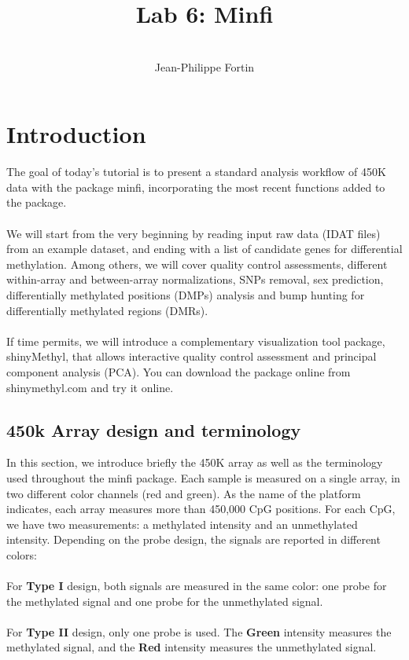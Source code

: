\documentclass[12pt]{article}
\title{\textbf{Lab 6: Minfi}}
\author{\\ Jean-Philippe Fortin }
\newcommand{\Rpackage}[1]{\textsf{#1}}
\begin{document}
\maketitle

\section{Introduction}
The goal of today's tutorial is to present a standard analysis workflow of 450K data with the package \Rpackage{minfi}, incorporating the most recent functions added to the package. \\
\\
We will start from the very beginning by reading input raw data (IDAT files) from an example dataset, and ending with a list of candidate genes for differential methylation. Among others, we will cover quality control assessments, different within-array and between-array normalizations, SNPs removal, sex prediction, differentially methylated positions (DMPs) analysis and bump hunting for differentially methylated regions (DMRs). \\
\\ 
If time permits, we will introduce a complementary visualization tool package, \Rpackage{shinyMethyl}, that allows interactive quality control assessment and principal component analysis (PCA). You can download the package online from shinymethyl.com and try it online.
\subsection*{450k Array design and terminology}
In this section, we introduce briefly the 450K array as well as the terminology used throughout the \Rpackage{minfi} package. 
Each sample is measured on a single array, in two different color channels (red and green). As the name of the platform indicates, each array measures more than 450,000 CpG positions. For each CpG, we have two measurements: a methylated intensity and an unmethylated intensity. Depending on the probe design, the signals are reported in different colors:
\\
\\
For \textbf{Type I} design, both signals are measured in the same color: one probe for the methylated signal and one probe for the unmethylated signal.
\\
\\
For \textbf{Type II} design, only one probe is used. The  \textbf{\textcolor[rgb]{0,0.6,0}{Green}} intensity measures the methylated signal, and the  \textbf{\textcolor[rgb]{0.7,0,0}{Red}} intensity measures the unmethylated signal. 
\end{document}
